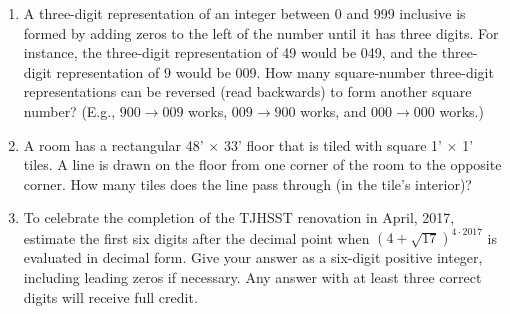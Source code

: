 \documentclass[11pt]{article}
\begin{document}
\begin{enumerate}[1.]
			\item A three-digit representation of an integer between 0 and 999 inclusive is formed by adding zeros to the left of the number until it has three digits. For instance, the three-digit representation of 49 would be 049, and the three-digit representation of 9 would be 009. How many square-number three-digit representations can be reversed (read backwards) to form another square number? (E.g., $900 \rightarrow 009$ works, $009 \rightarrow 900$ works, and $000 \rightarrow 000$ works.)
			
			\item A room has a rectangular 48' $\times$ 33' floor that is tiled with square 1' $\times$ 1' tiles. A line is drawn on the floor from one corner of the room to the opposite corner. How many tiles does the line pass through (in the tile's interior)?
			
			\item To celebrate the completion of the TJHSST renovation in April, 2017, estimate the first six digits after the decimal point when $\left(4 + \sqrt{17}\right)^{4\cdot2017}$ is evaluated in decimal form. Give your answer as a six-digit positive integer, including leading zeros if necessary. Any answer with at least three correct digits will receive full credit.
		\end{enumerate}
\end{document}
